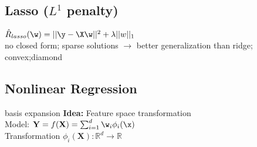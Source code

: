 \subsection*{Lasso ($L^1$ penalty)}
$\hat R_{lasso}(\w) = ||\y-\X\w||^2+\lambda|| w||_1$\\
no closed form; sparse solutions $\rightarrow$ better generalization than ridge; convex;diamond



\subsection*{Nonlinear Regression}
basis expansion
\textbf{Idea:} Feature space transformation\\
Model: $\mathbf{Y}=f(\mathbf{X})=\sum_{i=1}^d\w_i \phi_i(\x)$\\
Transformation $\phi_i(\mathbf{X}):\mathbb{R}^d \rightarrow \mathbb{R}$


